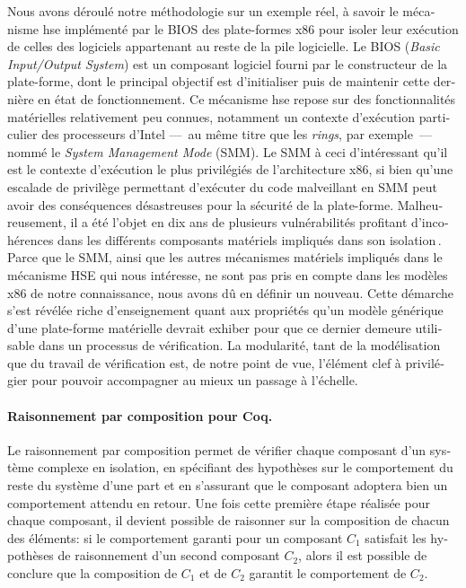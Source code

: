 \begin{otherlanguage}{french}
  Nous avons déroulé notre méthodologie sur un exemple réel, à savoir le
  mécanisme \ac{hse} implémenté par le BIOS des plate-formes x86 pour isoler
  leur exécution de celles des logiciels appartenant au reste de la pile
  logicielle.
  Le BIOS (\emph{Basic Input/Output System}) est un composant logiciel fourni
  par le constructeur de la plate-forme, dont le principal objectif est
  d’initialiser puis de maintenir cette dernière en état de fonctionnement.
  Ce mécanisme \ac{hse} repose sur des fonctionnalités matérielles relativement
  peu connues, notamment un contexte d’exécution particulier des processeurs
  d’Intel ---~au même titre que les \emph{rings}, par exemple~--- nommé le
  \emph{System Management Mode} (SMM).
  Le SMM à ceci d’intéressant qu’il est le contexte d’exécution le plus
  privilégiés de l’architecture x86, si bien qu’une escalade de privilège
  permettant d’exécuter du code malveillant en SMM peut avoir des conséquences
  désastreuses pour la sécurité de la plate-forme.
  Malheureusement, il a été l’objet en dix ans de plusieurs vulnérabilités
  profitant d’incohérences dans les différents composants matériels impliqués
  dans son
  isolation\,\cite{duflot2009smram,wojtczuk2009smram,domas2015sinkhole}.
  Parce que le SMM, ainsi que les autres mécanismes matériels impliqués dans le
  mécanisme HSE qui nous intéresse, ne sont pas pris en compte dans les modèles
  x86 de notre connaissance, nous avons dû en définir un nouveau.
  Cette démarche s’est révélée riche d’enseignement quant aux propriétés qu’un
  modèle générique d’une plate-forme matérielle devrait exhiber pour que ce
  dernier demeure utilisable dans un processus de vérification.
  La modularité, tant de la modélisation que du travail de vérification est, de
  notre point de vue, l’élément clef à privilégier pour pouvoir accompagner au
  mieux un passage à l’échelle.

  \paragraph{Raisonnement par composition pour Coq.}
  Le raisonnement par composition permet de vérifier chaque composant d’un
  système complexe en isolation, en spécifiant des hypothèses sur le comportement
  du reste du système d’une part et en s’assurant que le composant adoptera bien
  un comportement attendu en retour.
  Une fois cette première étape réalisée pour chaque composant, il devient
  possible de raisonner sur la composition de chacun des éléments: si le
  comportement garanti pour un composant \( C_1 \) satisfait les hypothèses de
  raisonnement d’un second composant \( C_2 \), alors il est possible de
  conclure que la composition de \( C_1 \) et de \( C_2 \) garantit le
  comportement de \( C_2 \).


\end{otherlanguage}
